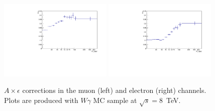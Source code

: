 \begin{figure}[htb]
  \begin{center}
     \includegraphics[width=0.48\textwidth]{../figs/figs_v11/MUON_WGamma/Constants/C_accXeff_MUON_WGamma.pdf}  \includegraphics[width=0.48\textwidth]{../figs/figs_v11/ELECTRON_WGamma/Constants/C_accXeff_ELECTRON_WGamma.pdf}
 \caption{$A\times\epsilon$ corrections in the muon (left) and electron (right) channels. Plots are produced with $W\gamma$ MC sample at $\sqrt{s}=$8~TeV. }
  \label{fig:accXeff_Wg}
  \end{center}
\end{figure}


